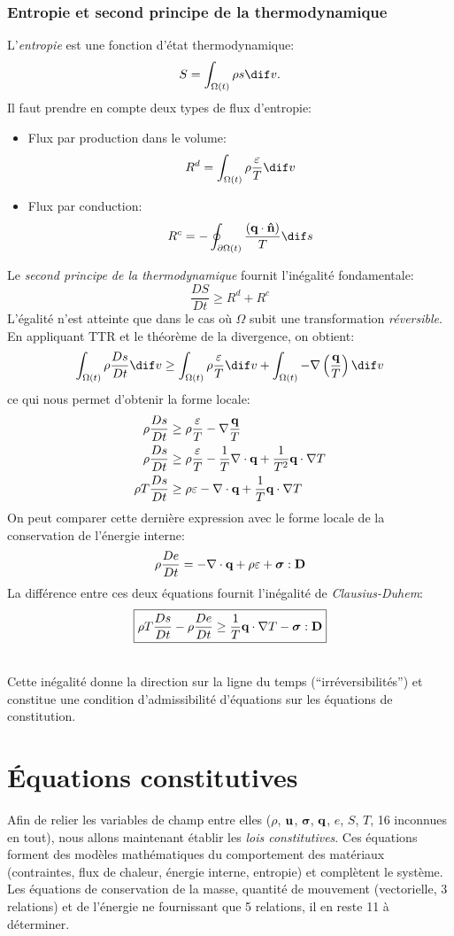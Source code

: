 \section{Entropie et second principe de la thermodynamique}
L'\emph{entropie} est une fonction d'état thermodynamique: $$S=\int_{\Omega (t)}\rho s \dif v.$$ Il faut prendre en compte deux types de flux d'entropie:
\begin{itemize}
\item Flux par production dans le volume: $$R^d=\int_{\Omega (t)}\rho \frac{\varepsilon}{T} \dif v$$
\item Flux par conduction: $$R^c=-\oint_{\partial \Omega (t)}\frac{(\fv{q}\cdot\fv{\^n})}{T} \dif s$$
\end{itemize}
Le \emph{second principe de la thermodynamique} fournit l'inégalité fondamentale:
$$\boxed{\frac{DS}{Dt}\geq R^d+R^c}$$ L'égalité n'est atteinte que dans le cas où $\Omega$ subit une transformation \emph{réversible}. En appliquant TTR et le théorème de la divergence, on obtient:
$$\int_{\Omega (t)}\rho\frac{Ds}{Dt} \dif v\geq \int_{\Omega (t)}\rho \frac{\varepsilon}{T} \dif v+\int_{\Omega (t)}-\nabla\left(\frac{\fv{q}}{T}\right) \dif v$$
ce qui nous permet d'obtenir la forme locale:
\begin{align*}
\rho\frac{Ds}{Dt}&\geq \rho \frac{\varepsilon}{T}-\nabla\frac{\textbf{q}}{T}\\
\rho\frac{Ds}{Dt}&\geq \rho \frac{\varepsilon}{T}-\frac{1}{T}\nabla\cdot\textbf{q}+\frac{1}{T^2}\textbf{q}\cdot\nabla T\\
\rho T\frac{Ds}{Dt}&\geq \rho \varepsilon-\nabla\cdot\textbf{q}+\frac{1}{T}\textbf{q}\cdot\nabla T
\end{align*}
On peut comparer cette dernière expression avec le forme locale de la conservation de l'énergie interne:
$$\rho\frac{De}{Dt}=-\nabla\cdot\textbf{q}+\rho\varepsilon+\boldsymbol{\sigma}:\textbf{D}$$
La différence entre ces deux équations fournit l'inégalité de \emph{Clausius-Duhem}:
$$\boxed{\rho T\frac{Ds}{Dt}-\rho\frac{De}{Dt}\geq\frac{1}{T}\textbf{q}\cdot\nabla T-\boldsymbol{\sigma}:\textbf{D}}$$
\paragraph{}
Cette inégalité donne la direction sur la ligne du temps (``irréversibilités'') et constitue une condition d'admissibilité d'équations sur les équations de constitution.

\part{\'Equations constitutives}
Afin de relier les variables de champ entre elles ($\rho$, $\textbf{u}$, $\boldsymbol{\sigma}$, $\textbf{q}$, $e$, $S$, $T$, 16 inconnues en tout), nous allons maintenant établir les \emph{lois constitutives}. Ces équations forment des modèles mathématiques du comportement des matériaux (contraintes, flux de chaleur, énergie interne, entropie) et complètent le système. Les équations de conservation de la masse, quantité de mouvement (vectorielle, 3 relations) et de l'énergie ne fournissant que 5 relations, il en reste 11 à déterminer.

